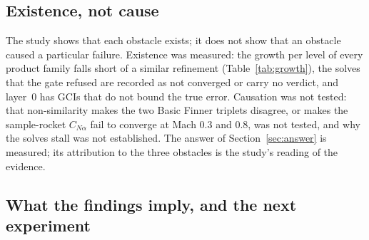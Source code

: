 \documentclass[twocolumn]{labreport}
\newcommand{\CNa}{C_{N\alpha}}
\begin{document}
\subsection{Existence, not cause}
\label{sec:existence}

The study shows that each obstacle exists; it does not show that an obstacle caused a particular failure.
Existence was measured: the growth per level of every product family falls short of a similar refinement (Table~\ref{tab:growth}), the solves that the gate refused are recorded as not converged or carry no verdict, and layer~0 has GCIs that do not bound the true error.
Causation was not tested: that non-similarity makes the two Basic Finner triplets disagree, or makes the sample-rocket $\CNa$ fail to converge at Mach 0.3 and 0.8, was not tested, and why the solves stall was not established.
The answer of Section~\ref{sec:answer} is measured; its attribution to the three obstacles is the study's reading of the evidence.

\subsection{What the findings imply, and the next experiment}
\label{sec:implications}
\end{document}
